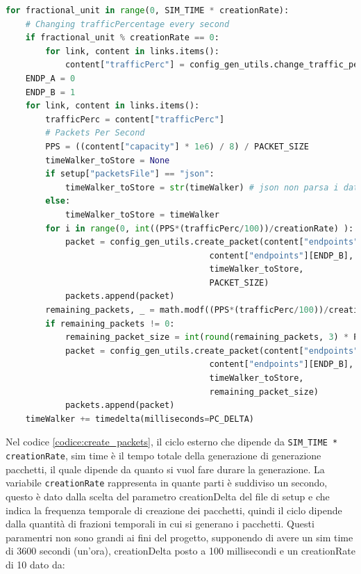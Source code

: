 \documentclass[binding=0.6cm]{sapthesis}
\begin{document}
{\scriptsize
\begin{lstlisting}[language=Python, basicstyle=\ttfamily, caption={Logica creazione pacchetti}, label={codice:create_packets}, breaklines=true]
for fractional_unit in range(0, SIM_TIME * creationRate):
    # Changing trafficPercentage every second
    if fractional_unit % creationRate == 0:
        for link, content in links.items():
            content["trafficPerc"] = config_gen_utils.change_traffic_perc(content["trafficPerc"], setup["trafficVariation"])
    ENDP_A = 0
    ENDP_B = 1
    for link, content in links.items():
        trafficPerc = content["trafficPerc"]
        # Packets Per Second
        PPS = ((content["capacity"] * 1e6) / 8) / PACKET_SIZE
        timeWalker_toStore = None
        if setup["packetsFile"] == "json":
            timeWalker_toStore = str(timeWalker) # json non parsa i datetime!
        else:
            timeWalker_toStore = timeWalker
        for i in range(0, int((PPS*(trafficPerc/100))/creationRate) ):
            packet = config_gen_utils.create_packet(content["endpoints"][ENDP_A],
                                         content["endpoints"][ENDP_B],
                                         timeWalker_toStore,
                                         PACKET_SIZE)
            packets.append(packet)
        remaining_packets, _ = math.modf((PPS*(trafficPerc/100))/creationRate)
        if remaining_packets != 0:
            remaining_packet_size = int(round(remaining_packets, 3) * PACKET_SIZE)
            packet = config_gen_utils.create_packet(content["endpoints"][ENDP_A],
                                         content["endpoints"][ENDP_B],
                                         timeWalker_toStore,
                                         remaining_packet_size)
            packets.append(packet)
    timeWalker += timedelta(milliseconds=PC_DELTA)
\end{lstlisting}
}

Nel codice \ref{codice:create_packets}, il ciclo esterno che dipende da \lstinline|SIM_TIME * creationRate|, sim time è il tempo totale della generazione di generazione pacchetti, 
il quale dipende da quanto si vuol fare durare la generazione. La variabile \lstinline|creationRate| rappresenta in quante parti è suddiviso un secondo, questo è dato
dalla scelta del parametro creationDelta del file di setup e che indica la frequenza temporale di creazione dei pacchetti, quindi il ciclo dipende dalla quantità di frazioni temporali in cui si generano i pacchetti.
Questi paramentri non sono grandi ai fini del progetto, supponendo di avere un sim time di 3600 secondi (un'ora), creationDelta posto a 100 millisecondi e un creationRate di 10 dato da: 
\end{document}
